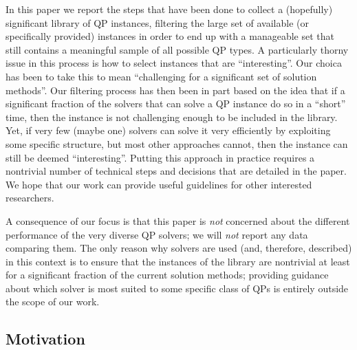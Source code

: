 In this paper we report the steps that have been done to collect a (hopefully) significant library of QP instances, filtering the large set of available (or specifically provided) instances in order to end up with a manageable set that still contains a meaningful sample of all possible QP types. A particularly thorny issue in this process is how to select instances that are ``interesting''. Our choica has been to take this to mean ``challenging for a significant set of solution methods''. Our filtering process has then been in part based on the idea that if a significant fraction of the solvers that can solve a QP instance do so in a ``short'' time, then the instance is not challenging enough to be included in the library. Yet, if very few (maybe one) solvers can solve it very efficiently by exploiting some specific structure, but most other approaches cannot, then the instance can still be deemed ``interesting''. Putting this approach in practice requires a nontrivial number of technical steps and decisions that are detailed in the paper. We hope that our work can provide useful guidelines for other interested researchers.

A consequence of our focus is that this paper is \emph{not} concerned about the different performance of the very diverse QP solvers; we will \emph{not} report any data comparing them. The only reason why solvers are used (and, therefore, described) in this context is to ensure that the instances of the library are nontrivial at least for a significant fraction of the current solution methods; providing guidance about which solver is most suited to some specific class of QPs is entirely outside the scope of our work.

\subsection{Motivation}\label{subsec:motiv}


